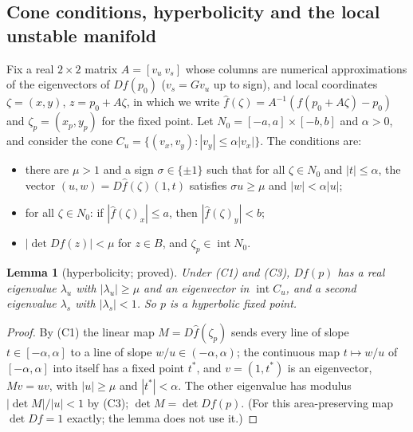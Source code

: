 \documentclass[11pt]{article}
\newtheorem{lemma}{Lemma}
\theoremstyle{definition}
\begin{document}
\subsection{Cone conditions, hyperbolicity and the local unstable manifold}

Fix a real $2\times 2$ matrix $A = [v_u\ v_s]$ whose columns are numerical approximations of the eigenvectors of $Df(p_0)$ ($v_s = Gv_u$ up to sign), and local coordinates $\zeta = (x, y)$, $z = p_0 + A\zeta$, in which we write $\hat f(\zeta) = A^{-1}(f(p_0 + A\zeta) - p_0)$ and $\zeta_p = (x_p, y_p)$ for the fixed point. Let $N_0 = [-a, a] \times [-b, b]$ and $\alpha > 0$, and consider the cone $C_u = \{(v_x, v_y) : |v_y| \le \alpha|v_x|\}$. The conditions are:
\begin{itemize}
\item[(C1)] there are $\mu > 1$ and a sign $\sigma \in \{\pm 1\}$ such that for all $\zeta \in N_0$ and $|t| \le \alpha$, the vector $(u, w) = D\hat f(\zeta)(1, t)$ satisfies $\sigma u \ge \mu$ and $|w| < \alpha|u|$;
\item[(C2)] for all $\zeta \in N_0$: if $|\hat f(\zeta)_x| \le a$, then $|\hat f(\zeta)_y| < b$;
\item[(C3)] $|\det Df(z)| < \mu$ for $z \in B$, and $\zeta_p \in \operatorname{int}N_0$.
\end{itemize}

\begin{lemma}[hyperbolicity; proved]\label{lem:hyp}
Under (C1) and (C3), $Df(p)$ has a real eigenvalue $\lambda_u$ with $|\lambda_u| \ge \mu$ and an eigenvector in $\operatorname{int}C_u$, and a second eigenvalue $\lambda_s$ with $|\lambda_s| < 1$. So $p$ is a hyperbolic fixed point.
\end{lemma}

\begin{proof}
By (C1) the linear map $M = D\hat f(\zeta_p)$ sends every line of slope $t \in [-\alpha, \alpha]$ to a line of slope $w/u \in (-\alpha, \alpha)$; the continuous map $t \mapsto w/u$ of $[-\alpha, \alpha]$ into itself has a fixed point $t^*$, and $v = (1, t^*)$ is an eigenvector, $Mv = uv$, with $|u| \ge \mu$ and $|t^*| < \alpha$. The other eigenvalue has modulus $|\det M|/|u| < 1$ by (C3); $\det M = \det Df(p)$. (For this area-preserving map $\det Df = 1$ exactly; the lemma does not use it.)
\end{proof}
\end{document}
